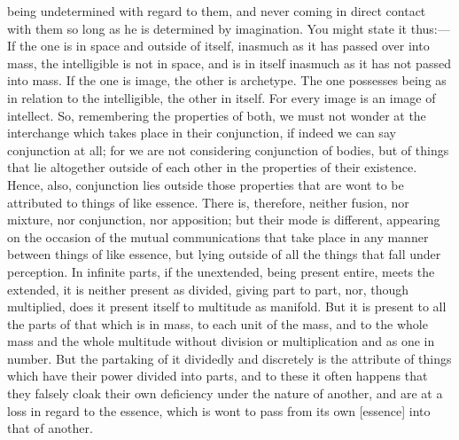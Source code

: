 \documentclass[12pt]{article}
\begin{document}
being undetermined with regard to them, and never coming in direct contact with
them so long as he is determined by imagination. You might state it thus:---If
the one is in space and outside of itself, inasmuch as it has passed over into
mass, the intelligible is not in space, and is in itself inasmuch as it has not
passed into mass. If the one is image, the other is archetype. The one
possesses being as in relation to the intelligible, the other in itself. For
every image is an image of intellect. So, remembering the properties of both,
we must not wonder at the interchange which takes place in their conjunction,
if indeed we can say conjunction at all; for we are not considering conjunction
of bodies, but of things that lie altogether outside of each other in the
properties of their existence. Hence, also, conjunction lies outside those
properties that are wont to be attributed to things of like essence. There is,
therefore, neither fusion, nor mixture, nor conjunction, nor apposition; but
their mode is different, appearing on the occasion of the mutual communications
that take place in any manner between things of like essence, but lying outside
of all the things that fall under perception. In infinite parts, if the
unextended, being present entire, meets the extended, it is neither present as
divided, giving part to part, nor, though multiplied, does it present itself to
multitude as manifold. But it is present to all the parts of that which is in
mass, to each unit of the mass, and to the whole mass and the whole multitude
without division or multiplication and as one in number. But the partaking of
it dividedly and discretely is the attribute of things which have their power
divided into parts, and to these it often happens that they falsely cloak their
own deficiency under the nature of another, and are at a loss in regard to the
essence, which is wont to pass from its own [essence] into that of another.
\end{document}
